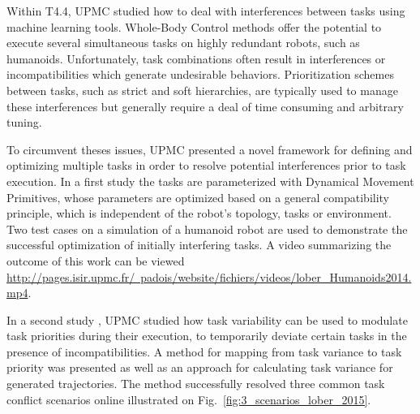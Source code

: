 

Within T4.4, UPMC studied how to deal with interferences between tasks using machine learning tools. Whole-Body Control methods offer the potential to execute several simultaneous tasks on highly redundant robots, such as humanoids. Unfortunately, task combinations often result in interferences or incompatibilities which generate undesirable behaviors. Prioritization schemes between tasks, such as strict and soft hierarchies, are typically used to manage these interferences but generally require a deal of time consuming and arbitrary tuning.

To circumvent theses issues, UPMC presented a novel framework for defining and optimizing multiple tasks in order to resolve potential interferences prior to task execution. In a first study \cite{lober-HUMANOIDS2014} the tasks are parameterized with Dynamical Movement Primitives, whose parameters are optimized based on a general compatibility principle, which is independent of the robot’s topology, tasks or environment. Two test cases on a simulation of a humanoid robot are used to demonstrate the successful optimization of initially interfering tasks. A video summarizing the outcome of this work can be viewed \href{here}{http://pages.isir.upmc.fr/~padois/website/fichiers/videos/lober_Humanoids2014.mp4}.

In a second study \cite{lobersubmittedIROS2015}, UPMC studied how task variability can be used to modulate task priorities during their execution, to temporarily deviate certain tasks in the presence of incompatibilities. A method for mapping from task variance to task priority was presented as well as an approach for calculating task variance for generated trajectories. The method successfully resolved three common task conflict scenarios online illustrated on Fig.~\ref{fig:3_scenarios_lober_2015}.

